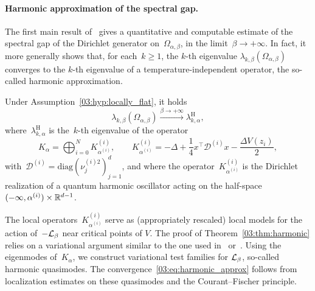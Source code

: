     \paragraph{Harmonic approximation of the spectral gap.}
   The first main result of~\cite{BLS25a} gives a quantitative and computable estimate of the spectral gap of the Dirichlet generator on~$\Omega_{\alpha,\beta}$, in the limit~$\beta\to+\infty$. In fact, it more generally shows that, for each~$k\geq 1$, the $k$-th eigenvalue $\lambda_{k,\beta}(\Omega_{\alpha,\beta})$ converges to the $k$-th eigenvalue of a temperature-independent operator, the so-called harmonic approximation.
    \begin{theorem}
        \label{03:thm:harmonic}
        Under Assumption~\ref{03:hyp:locally_flat}, it holds
        \begin{equation}
            \label{03:eq:harmonic_approx}
            \lambda_{k,\beta}(\Omega_{\alpha,\beta})\xrightarrow{\beta\to+\infty} \lambda_{k,\alpha}^{\mathrm{H}},
        \end{equation}
        where~$\lambda_{k,\alpha}^{\mathrm{H}}$ is the~$k$-th eigenvalue of the operator
        \begin{equation}
            \label{03:eq:harmonic_approximation}
            K_\alpha = \bigoplus_{i=0}^N K^{(i)}_{\alpha^{(i)}},\qquad K_{\alpha^{(i)}}^{(i)} = -\Delta + \frac14x^\top \mathcal D^{(i)}x -\frac{\Delta V(z_i)}2,
        \end{equation}
        with~$\mathcal D^{(i)} = \mathrm{diag}\left(\nu_j^{(i)2}\right)_{j=1}^d$, and where the operator~$K_{\alpha^{(i)}}^{(i)}$ is the Dirichlet realization of a quantum harmonic oscillator acting on the half-space~$(-\infty,\alpha^{(i)})\times \mathbb{R}^{d-1}$.
    \end{theorem}
    The local operators~$K_{\alpha^{(i)}}^{(i)}$ serve as (appropriately rescaled) local models for the action of~$-\mathcal{L}_\beta$ near critical points of $V$.
    The proof of Theorem~\ref{03:thm:harmonic} relies on a variational argument similar to the one used in~\cite[Theorem 11.1]{CFKS87} or~\cite{S83}.
    Using the eigenmodes of~$K_\alpha$, we construct variational test families for $\mathcal{L}_\beta$, so-called harmonic quasimodes. The convergence~\eqref{03:eq:harmonic_approx} follows from localization estimates on these quasimodes and the Courant--Fischer principle.

